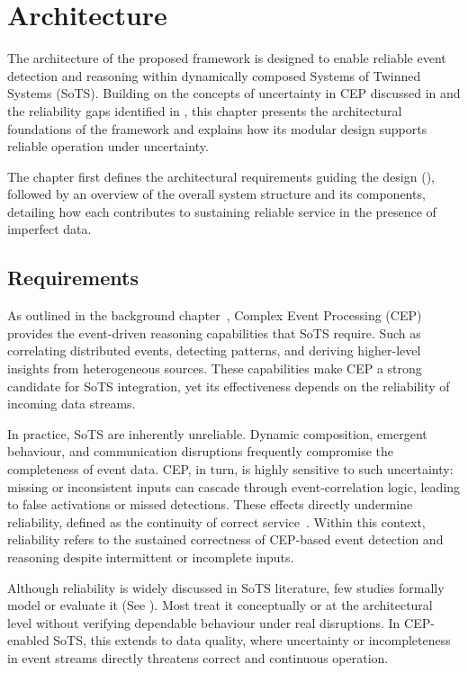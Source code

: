 \chapter{Architecture}\label{ch:architecture}

The architecture of the proposed framework is designed to enable reliable event detection and reasoning within dynamically composed Systems of Twinned Systems (SoTS).  
Building on the concepts of uncertainty in CEP discussed in  and the reliability gaps identified in , this chapter presents the architectural foundations of the framework and explains how its modular design supports reliable operation under uncertainty.

The chapter first defines the architectural requirements guiding the design (), followed by an overview of the overall system structure and its components, detailing how each contributes to sustaining reliable service in the presence of imperfect data.

\section{Requirements}\label{sec:arch-reqs}

As outlined in the background chapter~, Complex Event Processing (CEP) provides the event-driven reasoning capabilities that SoTS require. Such as correlating distributed events, detecting patterns, and deriving higher-level insights from heterogeneous sources. These capabilities make CEP a strong candidate for SoTS integration, yet its effectiveness depends on the reliability of incoming data streams.

In practice, SoTS are inherently unreliable. Dynamic composition, emergent behaviour, and communication disruptions frequently compromise the completeness of event data. CEP, in turn, is highly sensitive to such uncertainty: missing or inconsistent inputs can cascade through event-correlation logic, leading to false activations or missed detections. These effects directly undermine reliability, defined as the continuity of correct service~\cite{avizienis2004basic}. Within this context, reliability refers to the sustained correctness of CEP-based event detection and reasoning despite intermittent or incomplete inputs.

Although reliability is widely discussed in SoTS literature, few studies formally model or evaluate it (See ). Most treat it conceptually or at the architectural level without verifying dependable behaviour under real disruptions. In CEP-enabled SoTS, this extends to data quality, where uncertainty or incompleteness in event streams directly threatens correct and continuous operation.

